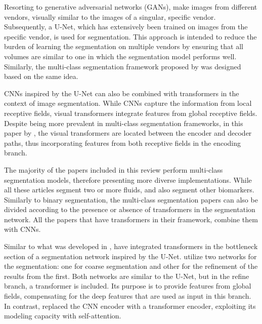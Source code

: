 \par
Resorting to generative adversarial networks (GANs), \textcite{Wu2023} make images from different vendors, visually similar to the images of a singular, specific vendor. Subsequently, a U-Net, which has extensively been trained on images from the specific vendor, is used for segmentation. This approach is intended to reduce the burden of learning the segmentation on multiple vendors by ensuring that all volumes are similar to one in which the segmentation model performs well. Similarly, the multi-class segmentation framework proposed by \textcite{Li2023} was designed based on the same idea. 
\par
CNNs inspired by the U-Net can also be combined with transformers in the context of image segmentation. While CNNs capture the information from local receptive fields, visual transformers integrate features from global receptive fields. Despite being more prevalent in multi-class segmentation frameworks, in this paper by \textcite{Quek2022}, the visual transformers are located between the encoder and decoder paths, thus incorporating features from both receptive fields in the encoding branch.
\par
The majority of the papers included in this review perform multi-class segmentation models, therefore presenting more diverse implementations. While all these articles segment two or more fluids, \textcite{Hassan2021a} and \textcite{Padilla2022} also segment other biomarkers. Similarly to binary segmentation, the multi-class segmentation papers can also be divided according to the presence \parencite{Zhang2023, Liu2024} or absence \parencite{Rahil2023, Hassan2021a, Sappa2021, Xing2022, Tang2022, Padilla2022, Hu2019, Mantel2021, Li2023, Gao2019, Hassan2021b, Lu2019} of transformers in the segmentation network. All the papers that have transformers in their framework, combine them with CNNs. 
\par
Similar to what was developed in \textcite{Quek2022}, \textcite{Liu2024} have integrated transformers in the bottleneck section of a segmentation network inspired by the U-Net. \textcite{Liu2024} utilize two networks for the segmentation: one for coarse segmentation and other for the refinement of the results from the first. Both networks are similar to the U-Net, but in the refine branch, a transformer is included. Its purpose is to provide features from global fields, compensating for the deep features that are used as input in this branch. In contrast, \textcite{Zhang2023} replaced the CNN encoder with a transformer encoder, exploiting its modeling capacity with self-attention.
